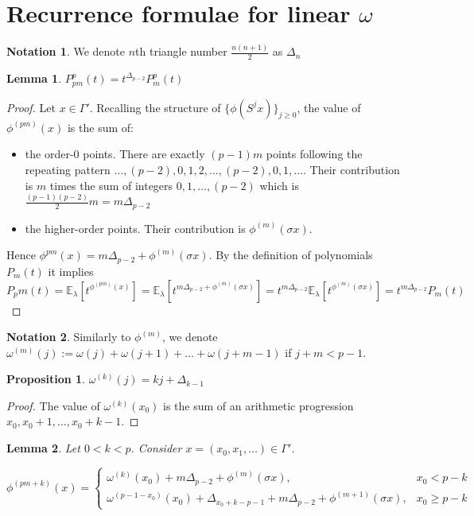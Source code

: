 \documentclass[a4paper]{article}
\theoremstyle{plain}
\newtheorem{lemma}{Lemma}[section]
\newtheorem{proposition}{Proposition}[section]
\theoremstyle{definition}
\newtheorem*{notation}{Notation}
\begin{document}
\section{Recurrence formulae for linear $\omega$}
\begin{notation} We denote $n$th triangle number $\frac{n(n+1)}{2}$ as $\Delta_n$ \end{notation}
\begin{lemma}\label{simpleCase} $P_{pm}^p(t)=t^{\Delta_{p-2}}P_m^p(t)$
\end{lemma}
\begin{proof}
Let $x \in \Gamma'$. Recalling the structure of $\{\phi(S^j x)\}_{j \ge 0}$, the value of $\phi^{(pm)}(x)$ is the sum of:
\begin{itemize}
\item the order-$0$ points. There are exactly $(p-1)m$ points following the repeating pattern $\ldots,(p-2),0,1,2,...,(p-2),0,1,\ldots$. Their contribution is $m$ times the sum of integers $0,1,\ldots,(p-2)$ which is $\frac{(p-1)(p-2)}{2}m=m\Delta_{p-2}$
\item the higher-order points. Their contribution is $\phi^{(m)}(\sigma x)$.
\end{itemize}
Hence $\phi^{pm}(x) = m\Delta_{p-2} + \phi^{(m)}(\sigma x)$. By the definition of polynomials $P_m(t)$ it implies 
$P_pm(t) = \mathbb{E}_\lambda\left[ t^{\phi^{(pm)}(x)}\right] = 
\mathbb{E}_\lambda\left[ t^{m\Delta_{p-2} + \phi^{(m)}(\sigma x)}\right] = 
t^{m\Delta_{p-2}} \mathbb{E}_\lambda \left[ t^{\phi^{(m)} (\sigma x)}  \right] = 
t^{m\Delta_{p-2} }P_m(t)$
\end{proof}
\begin{notation}
Similarly to $\phi^{(m)}$, we denote $\omega^{(m)}(j) := \omega(j) + \omega(j+1) + \ldots + \omega(j+m-1)$ if $j + m < p - 1$.
\end{notation}
\begin{proposition} $\omega^{(k)}(j) = k j + \Delta_{k-1}$
\end{proposition}
\begin{proof}
The value of $\omega^{(k)}(x_0)$ is the sum of an arithmetic progression $x_0, x_0 + 1, \ldots, x_0 + k-1$.
\end{proof}
\begin{lemma} \label{phiLemma}
Let $0 < k < p$. Consider $x=(x_0,x_1,\ldots) \in \Gamma'$.

$\phi^{(pm+k)}(x)= 
\begin{cases}
\omega^{(k)}(x_0) + m\Delta_{p-2} + \phi^{(m)}(\sigma x), & x_0 < p-k\\
\omega^{(p-1-x_0)}(x_0) + \Delta_{x_0+k-p-1}+m\Delta_{p-2}+\phi^{(m+1)}(\sigma x), & x_0 \ge p-k
\end{cases}$
\end{lemma}
\end{document}
